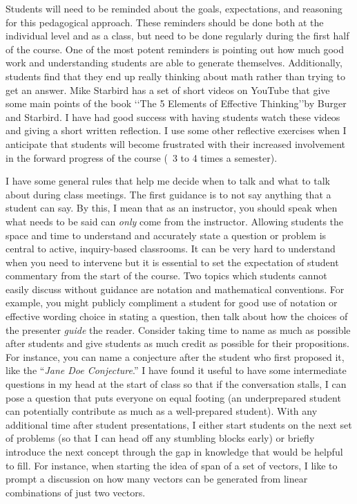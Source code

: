 \begin{annotation}
Students will need to be reminded  about the goals, expectations, and reasoning for this pedagogical approach. These reminders should be done both at the individual level and as a class, but need to be done regularly during the first half of the course. One of the most potent reminders is pointing out how much good work and understanding students are able to generate themselves. Additionally, students find that they end up really thinking about math rather than trying to get an answer. Mike Starbird has a set of short videos on YouTube that give some main points of the book \lq\lq{The 5 Elements of Effective Thinking}\rq\rq by Burger and Starbird. I have had good success with having students watch these videos and giving a short written reflection. I use  some other reflective exercises when I anticipate that students will become frustrated with their increased involvement in the forward progress of the course (~3 to 4 times a semester).

I have some general rules that help me  decide when to talk and what to talk about during class meetings. The first guidance is to not say anything that a student can say. By this, I mean that as an instructor, you should speak when what needs to be said can \emph{only} come from the instructor. Allowing students the space and time to understand and accurately state a question or problem is central to active, inquiry-based classrooms. It can be very hard to understand when you need to intervene but it is essential to set the expectation of  student commentary from the start of the course. Two topics which students cannot easily discuss without guidance are notation and mathematical conventions. For example, you might publicly compliment a student  for good use of notation or effective wording choice in stating  a question, then talk about how the choices of the presenter \emph{guide} the reader. Consider  taking time to name as much as possible after students and give students as much credit as possible for their propositions. For instance, you can name a conjecture after the student who first proposed it, like the “\emph{Jane Doe Conjecture}.” I have found it useful to have some intermediate questions in my head at the start of class so that if the conversation stalls, I can pose a question that puts everyone on equal footing (an underprepared student can potentially contribute as much as a well-prepared student). With any additional time after student presentations, I either start students  on the next set of problems (so that I can head off any stumbling blocks early) or briefly introduce the next concept through the gap in knowledge that would be helpful to fill. For instance, when starting the idea of span of a set of vectors, I like to prompt a discussion on how many vectors can be generated from linear combinations of just two vectors.



\end{annotation}
